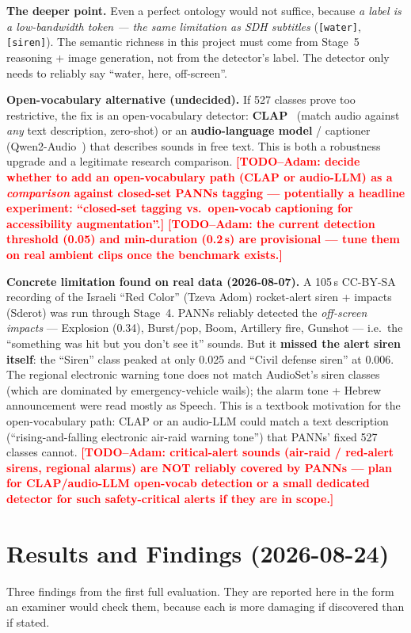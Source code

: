 \documentclass[11pt,a4paper]{article}
\newcommand{\TODO}[1]{\textcolor{red}{\textbf{[TODO--Adam: #1]}}}
\begin{document}
\textbf{The deeper point.} Even a perfect ontology would not suffice, because \emph{a label is a
low-bandwidth token --- the same limitation as SDH subtitles} (\texttt{[water]}, \texttt{[siren]}).
The semantic richness in this project must come from Stage~5 reasoning + image generation, not from
the detector's label. The detector only needs to reliably say ``water, here, off-screen''.

\textbf{Open-vocabulary alternative (undecided).} If 527 classes prove too restrictive, the fix is an
open-vocabulary detector: \textbf{CLAP}~\cite{clap} (match audio against \emph{any} text description,
zero-shot) or an \textbf{audio-language model} / captioner (Qwen2-Audio~\cite{qwenaudio}) that
describes sounds in free text. This is both a robustness upgrade and a legitimate research
comparison. \TODO{decide whether to add an open-vocabulary path (CLAP or audio-LLM) as a
\emph{comparison} against closed-set PANNs tagging --- potentially a headline experiment:
``closed-set tagging vs.\ open-vocab captioning for accessibility augmentation''.}
\TODO{the current detection threshold (0.05) and min-duration (0.2\,s) are provisional --- tune them
on real ambient clips once the benchmark exists.}

\textbf{Concrete limitation found on real data (2026-08-07).} A 105\,s CC-BY-SA recording of the
Israeli ``Red Color'' (Tzeva Adom) rocket-alert siren + impacts (Sderot) was run through Stage~4.
PANNs reliably detected the \emph{off-screen impacts} --- Explosion (0.34), Burst/pop, Boom,
Artillery fire, Gunshot --- i.e.\ the ``something was hit but you don't see it'' sounds. But it
\textbf{missed the alert siren itself}: the ``Siren'' class peaked at only 0.025 and ``Civil defense
siren'' at 0.006. The regional electronic warning tone does not match AudioSet's siren classes (which
are dominated by emergency-vehicle wails); the alarm tone + Hebrew announcement were read mostly as
Speech. This is a textbook motivation for the open-vocabulary path: CLAP or an audio-LLM could match a
text description (``rising-and-falling electronic air-raid warning tone'') that PANNs' fixed 527
classes cannot. \TODO{critical-alert sounds (air-raid / red-alert sirens, regional alarms) are NOT
reliably covered by PANNs --- plan for CLAP/audio-LLM open-vocab detection or a small dedicated
detector for such safety-critical alerts if they are in scope.}

\section{Results and Findings (2026-08-24)}\label{sec:findings}
Three findings from the first full evaluation. They are reported here in the form an
examiner would check them, because each is more damaging if discovered than if stated.
\end{document}
